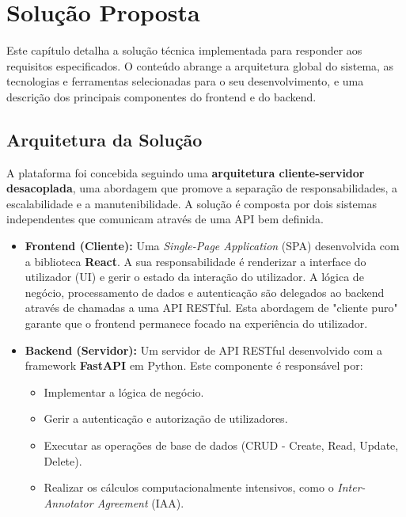 \chapter{Solução Proposta}
\label{cha:solucao_proposta}

Este capítulo detalha a solução técnica implementada para responder aos requisitos especificados. O conteúdo abrange a arquitetura global do sistema, as tecnologias e ferramentas selecionadas para o seu desenvolvimento, e uma descrição dos principais componentes do frontend e do backend.

\section{Arquitetura da Solução}

A plataforma foi concebida seguindo uma \textbf{arquitetura cliente-servidor desacoplada}, uma abordagem que promove a separação de responsabilidades, a escalabilidade e a manutenibilidade. A solução é composta por dois sistemas independentes que comunicam através de uma API bem definida.

\begin{itemize}
    \item \textbf{Frontend (Cliente):} Uma \textit{Single-Page Application} (SPA) desenvolvida com a biblioteca \textbf{React}. A sua responsabilidade é renderizar a interface do utilizador (UI) e gerir o estado da interação do utilizador. A lógica de negócio, processamento de dados e autenticação são delegados ao backend através de chamadas a uma API RESTful. Esta abordagem de "cliente puro" garante que o frontend permanece focado na experiência do utilizador.

    \item \textbf{Backend (Servidor):} Um servidor de API RESTful desenvolvido com a framework \textbf{FastAPI} em Python. Este componente é responsável por:
    \begin{itemize}
        \item Implementar a lógica de negócio.
        \item Gerir a autenticação e autorização de utilizadores.
        \item Executar as operações de base de dados (CRUD - Create, Read, Update, Delete).
        \item Realizar os cálculos computacionalmente intensivos, como o \textit{Inter-Annotator Agreement} (IAA).
    \end{itemize}
\end{itemize}

